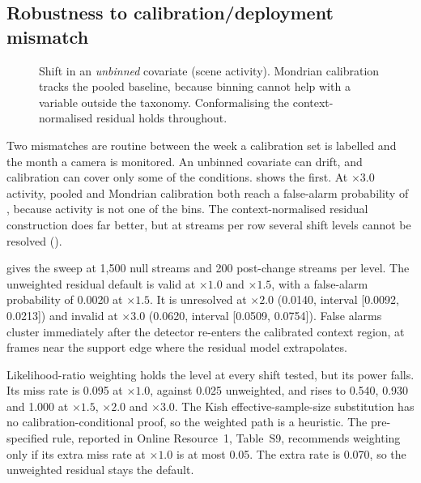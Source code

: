 \subsection{Robustness to calibration/deployment mismatch}
\label{sec:shift}

\begin{figure}[t]
  \centering
  \caption{Shift in an \emph{unbinned} covariate (scene activity). Mondrian calibration tracks the pooled baseline, because binning cannot help
  with a variable outside the taxonomy. Conformalising the context-normalised
  residual holds throughout.}
  \label{fig:shift}
\end{figure}


Two mismatches are routine between the week a calibration set is labelled and the
month a camera is monitored. An unbinned covariate can drift, and calibration can
cover only some of the conditions.  shows the first. At
$\times 3.0$ activity, pooled and Mondrian calibration both reach a false-alarm
probability of \ShiftPooledPfa{}, because activity is not one of the bins. The
context-normalised residual construction does far better, but at \ExpThreeReps{} streams per
row several shift levels cannot be resolved (\ShiftResidualUnresolvedRatios{}).


 gives the sweep at 1,500 null streams and 200 post-change streams per level. The unweighted residual default is valid at $\times 1.0$ and $\times 1.5$, with a false-alarm probability of 0.0020 at $\times 1.5$. It is unresolved at $\times 2.0$ (0.0140, interval [0.0092, 0.0213]) and invalid at $\times 3.0$ (0.0620, interval [0.0509, 0.0754]). False alarms cluster immediately after the detector re-enters the calibrated context region, at frames near the support edge where the residual model extrapolates.

Likelihood-ratio weighting holds the level at every shift tested, but its power falls. Its miss rate is 0.095 at $\times 1.0$, against 0.025 unweighted, and rises to 0.540, 0.930 and 1.000 at $\times 1.5$, $\times 2.0$ and $\times 3.0$. The Kish effective-sample-size substitution has no calibration-conditional proof, so the weighted path is a heuristic. The pre-specified rule, reported in Online Resource~1, Table~S9, recommends weighting only if its extra miss rate at $\times 1.0$ is at most 0.05. The extra rate is 0.070, so the unweighted residual stays the default.


